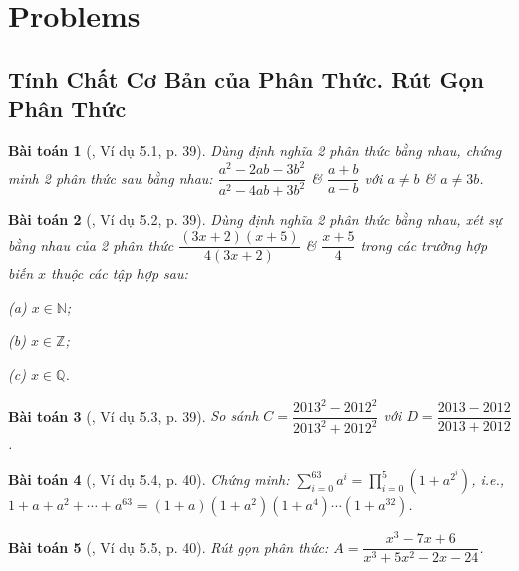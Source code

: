 \documentclass{article}
\numberwithin{equation}{section}
\newtheorem{baitoan}{Bài toán}[section]
\begin{document}

\section{Problems}

\subsection{Tính Chất Cơ Bản của Phân Thức. Rút Gọn Phân Thức}

\begin{baitoan}[\cite{Binh_Nam_Ngoc_Son_Toan_8_Dai_So}, Ví dụ 5.1, p. 39]
	Dùng định nghĩa 2 phân thức bằng nhau, chứng minh 2 phân thức sau bằng nhau: $\dfrac{a^2 - 2ab - 3b^2}{a^2 - 4ab + 3b^2}$ \& $\dfrac{a + b}{a - b}$ với $a\ne b$ \& $a\ne 3b$.
\end{baitoan}

\begin{baitoan}[\cite{Binh_Nam_Ngoc_Son_Toan_8_Dai_So}, Ví dụ 5.2, p. 39]
	Dùng định nghĩa 2 phân thức bằng nhau, xét sự bằng nhau của 2 phân thức $\dfrac{(3x + 2)(x + 5)}{4(3x + 2)}$ \& $\dfrac{x + 5}{4}$ trong các trường hợp biến $x$ thuộc các tập hợp sau:
	\begin{enumerate*}
		\item[(a)] $x\in\mathbb{N}$;
		\item[(b)] $x\in\mathbb{Z}$;
		\item[(c)] $x\in\mathbb{Q}$.
	\end{enumerate*}
\end{baitoan}

\begin{baitoan}[\cite{Binh_Nam_Ngoc_Son_Toan_8_Dai_So}, Ví dụ 5.3, p. 39]
	So sánh $C = \dfrac{2013^2 - 2012^2}{2013^2 + 2012^2}$ với $D = \dfrac{2013 - 2012}{2013 + 2012}$.
\end{baitoan}

\begin{baitoan}[\cite{Binh_Nam_Ngoc_Son_Toan_8_Dai_So}, Ví dụ 5.4, p. 40]
	Chứng minh: $\sum_{i=0}^{63} a^i = \prod_{i=0}^{5} (1 + a^{2^i})$, i.e., $1 + a + a^2 + \cdots + a^{63} = (1 + a)(1 + a^2)(1 + a^4)\cdots(1 + a^{32})$.
\end{baitoan}

\begin{baitoan}[\cite{Binh_Nam_Ngoc_Son_Toan_8_Dai_So}, Ví dụ 5.5, p. 40]
	Rút gọn phân thức: $A = \dfrac{x^3 - 7x + 6}{x^3 + 5x^2 - 2x - 24}$.
\end{baitoan}
\end{document}
